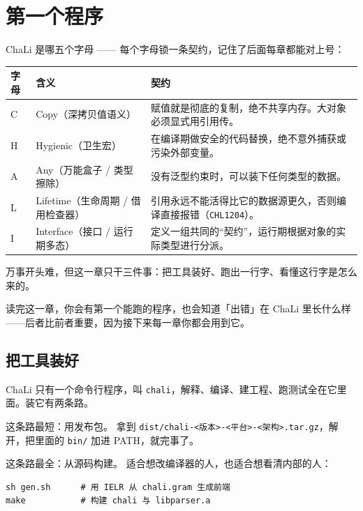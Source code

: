 \chapter{第一个程序}
\label{ch:01}

ChaLi 是哪五个字母 —— 每个字母锁一条契约，记住了后面每章都能对上号：

{\small\setlength{\tabcolsep}{4pt}
\begin{longtable}{>{\raggedright\arraybackslash}p{}>{\raggedright\arraybackslash}p{}>{\raggedright\arraybackslash}p{}}
\toprule
字母 & 含义 & 契约 \\
\midrule
\endhead
C & Copy（深拷贝值语义） & 赋值就是彻底的复制，绝不共享内存。大对象必须显式用引用传。 \\
H & Hygienic（卫生宏） & 在编译期做安全的代码替换，绝不意外捕获或污染外部变量。 \\
A & Any（万能盒子 / 类型擦除） & 没有泛型约束时，可以装下任何类型的数据。 \\
L & Lifetime（生命周期 / 借用检查器） & 引用永远不能活得比它的数据源更久，否则编译直接报错（\texttt{CHL1204}）。 \\
I & Interface（接口 / 运行期多态） & 定义一组共同的“契约”，运行期根据对象的实际类型进行分派。 \\
\bottomrule
\end{longtable}
}

万事开头难，但这一章只干三件事：把工具装好、跑出一行字、看懂这行字是怎么来的。

读完这一章，你会有第一个能跑的程序，也会知道「出错」在 ChaLi 里长什么样——后者比前者重要，因为接下来每一章你都会用到它。

\section{把工具装好}

ChaLi 只有一个命令行程序，叫 \texttt{chali}，解释、编译、建工程、跑测试全在它里面。装它有两条路。

这条路最短：用发布包。 拿到 \texttt{dist/\allowbreak{}chali-<\allowbreak{}版本>\allowbreak{}-<\allowbreak{}平台>\allowbreak{}-<\allowbreak{}架构>\allowbreak{}.\allowbreak{}tar.\allowbreak{}gz}，解开，把里面的 \texttt{bin/\allowbreak{}} 加进 PATH，就完事了。

这条路最全：从源码构建。 适合想改编译器的人，也适合想看清内部的人：

\par
\medskip
\begin{lstlisting}[style=sh]
sh gen.sh      # 用 IELR 从 chali.gram 生成前端
make           # 构建 chali 与 libparser.a
\end{lstlisting}
\par
\medskip

